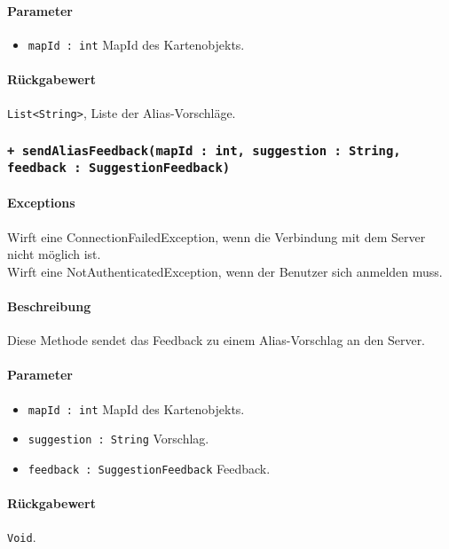 \paragraph*{Parameter}
\begin{itemize}
    \item \texttt{mapId : int} MapId des Kartenobjekts.
\end{itemize}
\paragraph*{Rückgabewert}
\texttt{List<String>}, Liste der Alias-Vorschläge.

\subsubsection*{\texttt{+ sendAliasFeedback(mapId : int, suggestion : String, feedback : SuggestionFeedback)}}%
\paragraph*{Exceptions}
Wirft eine ConnectionFailedException, wenn die Verbindung mit dem Server nicht möglich ist.\\
Wirft eine NotAuthenticatedException, wenn der Benutzer sich anmelden muss.
\paragraph*{Beschreibung}
Diese Methode sendet das Feedback zu einem Alias-Vorschlag an den Server.
\paragraph*{Parameter}
\begin{itemize}
    \item \texttt{mapId : int} MapId des Kartenobjekts.
    \item \texttt{suggestion : String} Vorschlag. 
    \item \texttt{feedback : SuggestionFeedback} Feedback.
\end{itemize}
\paragraph*{Rückgabewert}
\texttt{Void}.